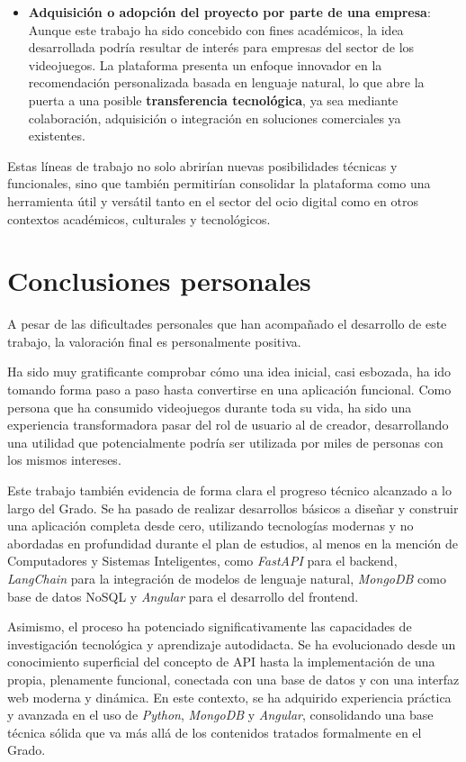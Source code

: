 \begin{itemize}
	
	\item \textbf{Adquisición o adopción del proyecto por parte de una empresa}:
	Aunque este trabajo ha sido concebido con fines académicos, la idea desarrollada podría resultar de interés para empresas del sector de los videojuegos. La plataforma presenta un enfoque innovador en la recomendación personalizada basada en lenguaje natural, lo que abre la puerta a una posible \textbf{transferencia tecnológica}, ya sea mediante colaboración, adquisición o integración en soluciones comerciales ya existentes.
	
\end{itemize}

Estas líneas de trabajo no solo abrirían nuevas posibilidades técnicas y funcionales, sino que también permitirían consolidar la plataforma como una herramienta útil y versátil tanto en el sector del ocio digital como en otros contextos académicos, culturales y tecnológicos.


\newpage
\section{Conclusiones personales}

A pesar de las dificultades personales que han acompañado el desarrollo de este trabajo, la valoración final es personalmente positiva.

Ha sido muy gratificante comprobar cómo una idea inicial, casi esbozada, ha ido tomando forma paso a paso hasta convertirse en una aplicación funcional. Como persona que ha consumido videojuegos durante toda su vida, ha sido una experiencia transformadora pasar del rol de usuario al de creador, desarrollando una utilidad que potencialmente podría ser utilizada por miles de personas con los mismos intereses.

Este trabajo también evidencia de forma clara el progreso técnico alcanzado a lo largo del Grado. Se ha pasado de realizar desarrollos básicos a diseñar y construir una aplicación completa desde cero, utilizando tecnologías modernas y no abordadas en profundidad durante el plan de estudios, al menos en la mención de Computadores y Sistemas Inteligentes, como \textit{FastAPI} para el backend, \textit{LangChain} para la integración de modelos de lenguaje natural, \textit{MongoDB} como base de datos NoSQL y \textit{Angular} para el desarrollo del frontend.

Asimismo, el proceso ha potenciado significativamente las capacidades de investigación tecnológica y aprendizaje autodidacta. Se ha evolucionado desde un conocimiento superficial del concepto de API hasta la implementación de una propia, plenamente funcional, conectada con una base de datos y con una interfaz web moderna y dinámica. En este contexto, se ha adquirido experiencia práctica y avanzada en el uso de \textit{Python}, \textit{MongoDB} y \textit{Angular}, consolidando una base técnica sólida que va más allá de los contenidos tratados formalmente en el Grado.

